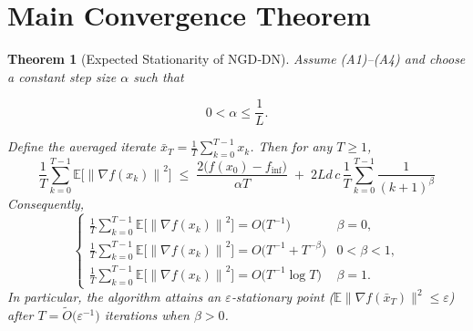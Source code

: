 \documentclass{article}
\newtheorem{theorem}{Theorem}
\newcommand{\E}{\mathbb{E}}
\newcommand{\norm}[1]{\left\lVert #1\right\rVert}
\begin{document}
\section*{Main Convergence Theorem}
\begin{theorem}[Expected Stationarity of NGD‑DN]\label{thm:main}
Assume (A1)–(A4) and choose a constant step size $\alpha$ such that  

\[
0<\alpha\le\frac{1}{L}.
\tag{3}
\]

Define the averaged iterate $\bar x_{T}= \frac{1}{T}\sum_{k=0}^{T-1}x_{k}$.
Then for any $T\ge 1$,
\[
\boxed{
\frac{1}{T}\sum_{k=0}^{T-1}\E\!\big[\norm{\nabla f(x_{k})}^{2}\big]
\;\le\;
\frac{2\big(f(x_{0})-f_{\inf}\big)}{\alpha T}
\;+\;
2L d\,c\,
\frac{1}{T}\sum_{k=0}^{T-1}\frac{1}{(k+1)^{\beta}}
}
\tag{4}
\]
Consequently,
\[
\begin{cases}
\displaystyle 
\frac{1}{T}\sum_{k=0}^{T-1}\E\!\big[\norm{\nabla f(x_{k})}^{2}\big]
=O\!\big(T^{-1}\big) & \beta=0,\\[6pt]
\displaystyle 
\frac{1}{T}\sum_{k=0}^{T-1}\E\!\big[\norm{\nabla f(x_{k})}^{2}\big]
=O\!\big(T^{-1}+T^{-\beta}\big) & 0<\beta<1,\\[6pt]
\displaystyle 
\frac{1}{T}\sum_{k=0}^{T-1}\E\!\big[\norm{\nabla f(x_{k})}^{2}\big]
=O\!\big(T^{-1}\log T\big) & \beta=1 .
\end{cases}
\tag{5}
\]
In particular, the algorithm attains an $\varepsilon$‑stationary point
($\E\|\nabla f(\bar x_{T})\|^{2}\le\varepsilon$) after  
$T= \widetilde O\!\big(\varepsilon^{-1}\big)$ iterations when $\beta>0$.
\end{theorem}
\end{document}
